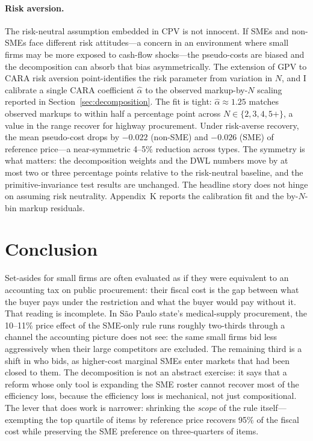 \documentclass[12pt]{article}
\begin{document}
\paragraph{Risk aversion.}
The risk-neutral assumption embedded in CPV is not innocent. If
SMEs and non-SMEs face different risk attitudes---a concern in
an environment where small firms may be more exposed to
cash-flow shocks---the pseudo-costs are biased and the
decomposition can absorb that bias asymmetrically. The
\citet{campoguerre2011} extension of GPV to CARA risk aversion
point-identifies the risk parameter from variation in $N$, and
I calibrate a single CARA coefficient $\hat\alpha$ to the
observed markup-by-$N$ scaling reported in
Section~\ref{sec:decomposition}. The fit is tight:
$\hat\alpha \approx 1.25$ matches observed markups to within
half a percentage point across $N \in \{2, 3, 4, 5+\}$, a value
in the range \citet{campoguerre2011} recover for highway
procurement. Under risk-averse recovery, the mean pseudo-cost
drops by $-0.022$ (non-SME) and $-0.026$ (SME) of reference
price---a near-symmetric 4--5\% reduction across types. The
symmetry is what matters: the decomposition weights and the DWL
numbers move by at most two or three percentage points relative
to the risk-neutral baseline, and the primitive-invariance test
results are unchanged. The headline story does not hinge on
assuming risk neutrality. Appendix~K reports the calibration fit
and the by-$N$-bin markup residuals.

\section{Conclusion}
\label{sec:conclusion}

Set-asides for small firms are often evaluated as if they were
equivalent to an accounting tax on public procurement: their fiscal
cost is the gap between what the buyer pays under the restriction and
what the buyer would pay without it. That reading is incomplete. In
S\~ao Paulo state's medical-supply procurement, the 10--11\% price
effect of the SME-only rule runs roughly two-thirds through a channel
the accounting picture does not see: the same small firms bid less
aggressively when their large competitors are excluded. The remaining
third is a shift in who bids, as higher-cost marginal SMEs enter
markets that had been closed to them. The decomposition is not an
abstract exercise: it says that a reform whose only tool is expanding
the SME roster cannot recover most of the efficiency loss, because
the efficiency loss is mechanical, not just compositional. The lever
that does work is narrower: shrinking the \emph{scope} of the rule
itself---exempting the top quartile of items by reference price
recovers 95\% of the fiscal cost while preserving the SME preference
on three-quarters of items.
\end{document}
